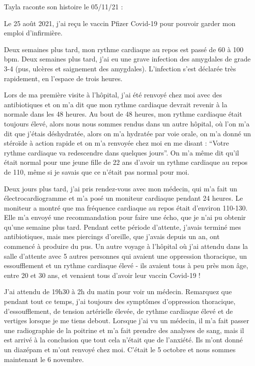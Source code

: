 Tayla raconte son histoire le 05/11/21 :

Le 25 août 2021, j'ai reçu le vaccin Pfizer Covid-19 pour pouvoir garder mon
emploi d'infirmière.

Deux semaines plus tard, mon rythme cardiaque au repos est passé de 60 à 100
bpm. Deux semaines plus tard, j'ai eu une grave infection des amygdales de grade
3-4 (pus, ulcères et saignement des amygdales). L'infection s'est déclarée très
rapidement, en l'espace de trois heures.

Lors de ma première visite à l'hôpital, j'ai été renvoyé chez moi avec des
antibiotiques et on m'a dit que mon rythme cardiaque devrait revenir à la
normale dans les 48 heures. Au bout de 48 heures, mon rythme cardiaque était
toujours élevé, alors nous nous sommes rendus dans un autre hôpital, où l'on m'a
dit que j'étais déshydratée, alors on m'a hydratée par voie orale, on m'a donné
un stéroïde à action rapide et on m'a renvoyée chez moi en me disant : ``Votre
rythme cardiaque va redescendre dans quelques jours''. On m'a même dit qu'il
était normal pour une jeune fille de 22 ans d'avoir un rythme cardiaque au repos
de 110, même si je savais que ce n'était pas normal pour moi.

Deux jours plus tard, j'ai pris rendez-vous avec mon médecin, qui m'a fait un
électrocardiogramme et m'a posé un moniteur cardiaque pendant 24 heures. Le
moniteur a montré que ma fréquence cardiaque au repos était d'environ
110-130. Elle m'a envoyé une recommandation pour faire une écho, que je n'ai pu
obtenir qu'une semaine plus tard. Pendant cette période d'attente, j'avais
terminé mes antibiotiques, mais mes piercings d'oreille, que j'avais depuis un
an, ont commencé à produire du pus. Un autre voyage à l'hôpital où j'ai attendu
dans la salle d'attente avec 5 autres personnes qui avaient une oppression
thoracique, un essoufflement et un rythme cardiaque élevé - ils avaient tous à
peu près mon âge, entre 20 et 30 ans, et venaient tous d'avoir leur vaccin
Covid-19 !

J'ai attendu de 19h30 à 2h du matin pour voir un médecin. Remarquez que pendant
tout ce temps, j'ai toujours des symptômes d'oppression thoracique,
d'essoufflement, de tension artérielle élevée, de rythme cardiaque élevé et de
vertiges lorsque je me tiens debout. Lorsque j'ai vu un médecin, il m'a fait
passer une radiographie de la poitrine et m'a fait prendre des analyses de sang,
mais il est arrivé à la conclusion que tout cela n'était que de l'anxiété. Ils
m'ont donné un diazépam et m'ont renvoyé chez moi. C'était le 5 octobre et nous
sommes maintenant le 6 novembre.

